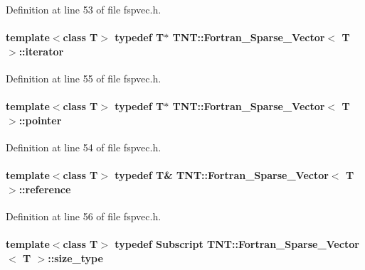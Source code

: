 Definition at line 53 of file fspvec.h.

\paragraph[{iterator}]{\setlength{\rightskip}{0pt plus 5cm}template$<$class T$>$ typedef T$\ast$ {\bf TNT::Fortran\_\-Sparse\_\-Vector}$<$ T $>$::{\bf iterator}}\hfill\label{class_t_n_t_1_1_fortran___sparse___vector_a6ef1e42eef916625b75b1f4d77542059}


Definition at line 55 of file fspvec.h.

\paragraph[{pointer}]{\setlength{\rightskip}{0pt plus 5cm}template$<$class T$>$ typedef T$\ast$ {\bf TNT::Fortran\_\-Sparse\_\-Vector}$<$ T $>$::{\bf pointer}}\hfill\label{class_t_n_t_1_1_fortran___sparse___vector_a2f899a23b5f4a573eaea47d97fcbf48b}


Definition at line 54 of file fspvec.h.

\paragraph[{reference}]{\setlength{\rightskip}{0pt plus 5cm}template$<$class T$>$ typedef T\& {\bf TNT::Fortran\_\-Sparse\_\-Vector}$<$ T $>$::{\bf reference}}\hfill\label{class_t_n_t_1_1_fortran___sparse___vector_a4b6fe1d395c3b4c853ff15420cf7fa99}


Definition at line 56 of file fspvec.h.

\paragraph[{size\_\-type}]{\setlength{\rightskip}{0pt plus 5cm}template$<$class T$>$ typedef {\bf Subscript} {\bf TNT::Fortran\_\-Sparse\_\-Vector}$<$ T $>$::{\bf size\_\-type}}\hfill\label{class_t_n_t_1_1_fortran___sparse___vector_afd4ab025a14d99715f114fa610d851f3}


